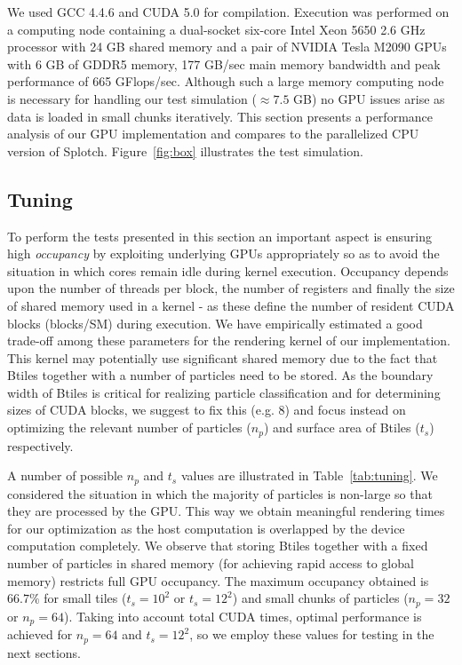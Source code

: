 \documentclass[1p]{elsarticle}
\begin{document}
We used GCC 4.4.6 and CUDA 5.0 for compilation. Execution was performed on a computing node containing a dual-socket six-core Intel Xeon 5650 2.6 GHz processor with 24 GB shared memory and a pair of NVIDIA Tesla M2090 GPUs with 6 GB of GDDR5 memory, 177 GB/sec main memory bandwidth and peak performance of 665 GFlops/sec. Although such a large memory computing node is necessary for handling our test simulation ($\approx 7.5$ GB) no GPU issues arise as data is loaded in small chunks iteratively. This section presents a performance analysis of our GPU implementation and compares to the parallelized CPU version of Splotch. Figure~\ref{fig:box} illustrates the test simulation.

\subsection{Tuning}
\label{sec:gpuperf}
To perform the tests presented in this section an important aspect is ensuring high {\it occupancy} by exploiting underlying GPUs appropriately so as to avoid the situation in which cores remain idle during kernel execution. Occupancy depends upon the number of threads per block, the number of registers and finally the size of shared memory used in a kernel - as these define the number of resident CUDA blocks (blocks/SM) during execution. We have empirically estimated a good trade-off among these parameters for the rendering kernel of our implementation. This kernel may potentially use significant shared memory due to the fact that Btiles together with a number of particles need to be stored. As the boundary width of Btiles is critical for realizing particle classification and for determining sizes of CUDA blocks, we suggest to fix this (e.g. 8) and focus instead on optimizing the relevant number of particles ($n_p$) and surface area of Btiles ($t_s$) respectively.

A number of possible $n_p$ and $t_s$ values are illustrated in Table~\ref{tab:tuning}. We considered the situation in which the majority of particles is non-large so that they are processed by the GPU. This way we obtain meaningful rendering times for our optimization as the host computation is overlapped by the device computation completely. We observe that storing Btiles together with a fixed number of particles in shared memory (for achieving rapid access to global memory) restricts full GPU occupancy. The maximum occupancy obtained is $66.7\%$ for small tiles ($t_s = 10^{2}$ or $t_s = 12^{2}$) and small chunks of particles ($n_p = 32$ or $n_p=64$). Taking into account total CUDA times, optimal performance is achieved for $n_p=64$ and $t_s = 12^{2}$, so we employ these values for testing in the next sections.
\end{document}

